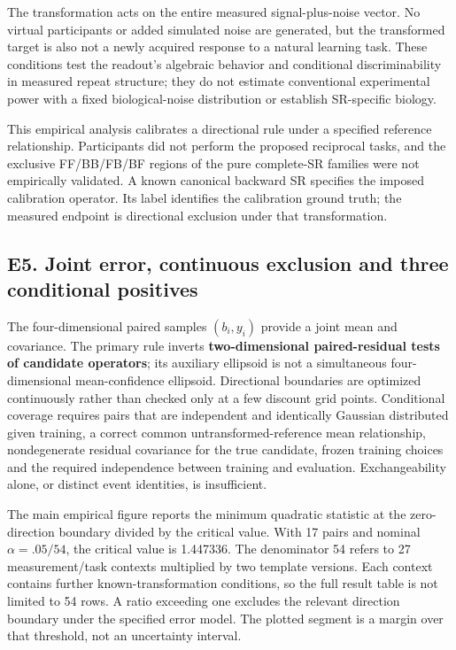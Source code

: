 \documentclass[11pt,a4paper]{article}
\begin{document}
The transformation acts on the entire measured signal-plus-noise vector.
No virtual participants or added simulated noise are generated, but the
transformed target is also not a newly acquired response to a natural
learning task. These conditions test the readout's algebraic behavior
and conditional discriminability in measured repeat structure; they do
not estimate conventional experimental power with a fixed
biological-noise distribution or establish SR-specific biology.

This empirical analysis calibrates a directional rule under a specified
reference relationship. Participants did not perform the proposed
reciprocal tasks, and the exclusive FF/BB/FB/BF regions of the pure
complete-SR families were not empirically validated. A known canonical
backward SR specifies the imposed calibration operator. Its label
identifies the calibration ground truth; the measured endpoint is
directional exclusion under that transformation.

\subsection{E5. Joint error, continuous exclusion and three conditional
positives}\label{e5.-joint-error-continuous-exclusion-and-three-conditional-positives}

The four-dimensional paired samples \((b_i,y_i)\) provide a joint mean
and covariance. The primary rule inverts \textbf{two-dimensional
paired-residual tests of candidate operators}; its auxiliary ellipsoid
is not a simultaneous four-dimensional mean-confidence ellipsoid.
Directional boundaries are optimized continuously rather than checked
only at a few discount grid points. Conditional coverage requires pairs
that are independent and identically Gaussian distributed given
training, a correct common untransformed-reference mean relationship,
nondegenerate residual covariance for the true candidate, frozen
training choices and the required independence between training and
evaluation. Exchangeability alone, or distinct event identities, is
insufficient.

The main empirical figure reports the minimum quadratic statistic at the
zero-direction boundary divided by the critical value. With 17 pairs and
nominal \(\alpha=.05/54\), the critical value is 1.447336. The
denominator 54 refers to 27 measurement/task contexts multiplied by two
template versions. Each context contains further known-transformation
conditions, so the full result table is not limited to 54 rows. A ratio
exceeding one excludes the relevant direction boundary under the
specified error model. The plotted segment is a margin over that
threshold, not an uncertainty interval.
\end{document}
